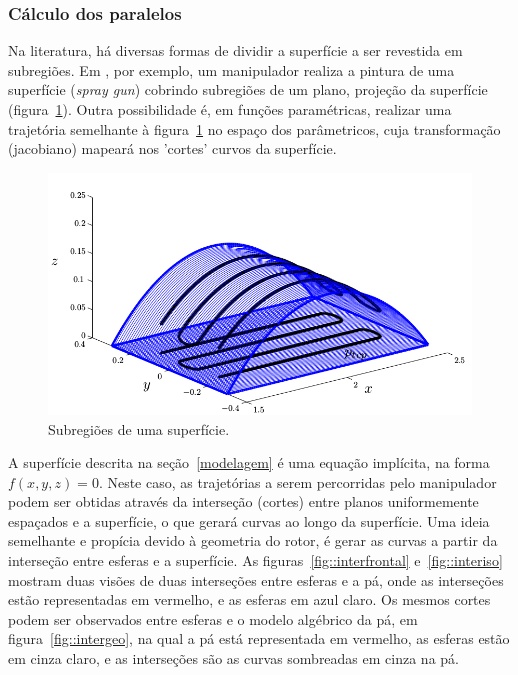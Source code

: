 \subsubsection{Cálculo dos paralelos}
Na literatura, há diversas formas de dividir a superfície a ser revestida em
subregiões. Em \cite{from2010off}, por exemplo, um manipulador realiza a pintura
de uma superfície (\textit{spray gun}) cobrindo subregiões de um plano, projeção
da superfície (figura~\ref{fig::pal}). Outra possibilidade é, em funções
paramétricas, realizar uma trajetória semelhante à figura~\ref{fig::pal} no
espaço dos parâmetricos, cuja transformação (jacobiano) mapeará nos 'cortes' curvos da
superfície.

\begin{figure}[!ht]
	\centering	
	\includegraphics[width=\columnwidth]{figs/planejamento/pal.png}
	\caption{Subregiões de uma superfície.}
	\label{fig::pal}
\end{figure}



A superfície descrita na seção~\ref{modelagem} é uma equação implícita, na forma
$f(x,y,z)=0$. Neste caso, as trajetórias a serem percorridas pelo manipulador
podem ser obtidas através da interseção (cortes) entre planos uniformemente
espaçados e a superfície, o que gerará curvas ao longo da superfície. Uma ideia
semelhante e propícia devido à geometria do rotor, é gerar as curvas a partir da interseção
entre esferas e a superfície. As figuras~\ref{fig::interfrontal}
e~\ref{fig::interiso} mostram duas visões de duas interseções entre esferas e
a pá, onde as interseções estão representadas em vermelho, e as esferas em
azul claro. Os mesmos cortes podem ser observados entre esferas e o modelo
algébrico da pá, em figura~\ref{fig::intergeo}, na qual a pá está representada
em vermelho, as esferas estão em cinza claro, e as interseções são as curvas
sombreadas em cinza na pá.

